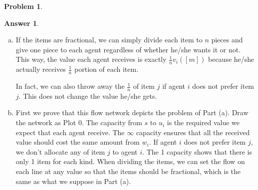 \documentclass{article}
\theoremstyle{definition}
\newtheorem{prob}{Problem}
\newtheorem{ans}{Answer}
\begin{document}
\begin{prob}
\begin{enumerate}[(a)]
		\end{enumerate}
	\end{prob}
	
	\begin{ans}
		~
		
		\begin{enumerate}[(a)]
			\item If the items are fractional, we can simply divide each item to $n$ pieces and give one piece to each agent regardless of whether he/she wants it or not. This way, the value each agent receives is exactly $\frac{1}{n} v_{i}([m])$ because he/she actually receives $\frac{1}{n}$ portion of each item. 
			
			In fact, we can also throw away the $\frac{1}{n}$ of item $j$ if agent $i$ does not prefer item $j$. This does not change the value he/she gets. 
	
			\item First we prove that this flow network depicts the problem of Part (a). Draw the network as Plot 0. The capacity from $s$ to $u_i$ is the required value we expect that each agent receive. The $\infty$ capacity ensures that all the received value should cost the same amount from $w_i$. If agent $i$ does not prefer item $j$, we don't allocate any of item $j$ to agent $i$. The 1 capacity shows that there is only 1 item for each kind. When dividing the items, we can set the flow on each line at any value so that the items should be fractional, which is the same as what we suppose in Part (a).
			

\end{enumerate}
\end{ans}
\end{document}
